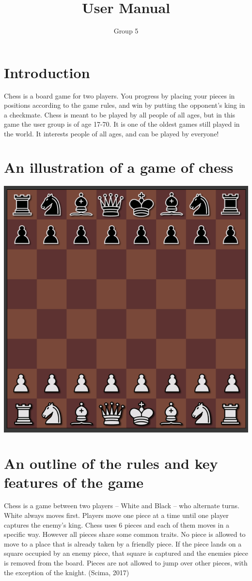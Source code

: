 \documentclass{article}
\title{User Manual}
\author{Group 5}
\date{}
\begin{document}
    \maketitle
    \section{Introduction}
    \noindent
    Chess is a board game for two players. You progress by placing your pieces in positions according to the game rules, and win by putting the opponent's king in a checkmate. Chess is meant to be played by all people of all ages, but in this game the user group is of age 17-70. It is one of the oldest games still played in the world. It interests people of all ages, and can be played by everyone!
    
    \section{An illustration of a game of chess}
    \includegraphics[scale=0.5]{image5.png}
    
    
    \section{An outline of the rules and key features of the game}
    \noindent
    Chess is a game between two players  -- White and Black -- who alternate turns. White always moves first. Players move one piece at a time until one player captures the enemy's king.  Chess uses 6 pieces and each of them moves in a specific way. However all pieces share some common traits. No piece is allowed to move to a place that is already taken by a friendly piece. If the piece lands on a square occupied by an enemy piece, that square is captured and the enemies piece is removed from the board. Pieces are not allowed to jump over other pieces, with the exception of the knight. (Scima, 2017)
\end{document}
